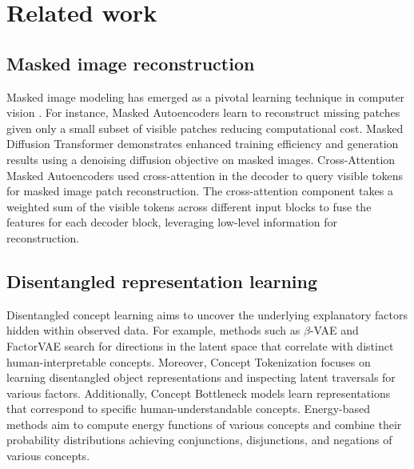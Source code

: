 \section{Related work}
\subsection{Masked image reconstruction}

Masked image modeling has emerged as a pivotal learning technique in computer vision \cite{he2022masked,yue2023understanding,zheng2023fast,chen2023improving,fu2024rethinking}. For instance, Masked Autoencoders \cite{he2022masked} learn to reconstruct missing patches given only a small subset of visible patches reducing computational cost. Masked Diffusion Transformer \cite{zheng2023fast} demonstrates enhanced training efficiency and generation results using a denoising diffusion objective on masked images. Cross-Attention Masked Autoencoders \cite{fu2024rethinking} used cross-attention in the decoder to query visible tokens for masked image patch reconstruction. The cross-attention component takes a weighted sum of the visible tokens across different input blocks to fuse the features for each decoder block, leveraging low-level information for reconstruction.

\subsection{Disentangled representation learning}

Disentangled concept learning \cite{bengio2013representation,higgins2017beta,locatello2019challenging,harkonen2020ganspace,alias2021neural,yang2022visual,sun2023associative,ismail2023concept} aims to uncover the underlying explanatory factors hidden within observed data. For example, methods such as $\beta$-VAE \cite{higgins2017beta} and FactorVAE \cite{kim2018disentangling} search for directions in the latent space that correlate with distinct human-interpretable concepts. Moreover, Concept Tokenization \cite{yang2022visual} focuses on learning disentangled object representations and inspecting latent traversals for various factors. Additionally, Concept Bottleneck models \cite{ismail2023concept,yuksekgonul2022post,oikarinen2023label,yang2023language} learn representations that correspond to specific human-understandable concepts. Energy-based methods \cite{du2020compositional,li2022energy} aim to compute energy functions of various concepts and combine their probability distributions achieving conjunctions, disjunctions, and negations of various concepts.

